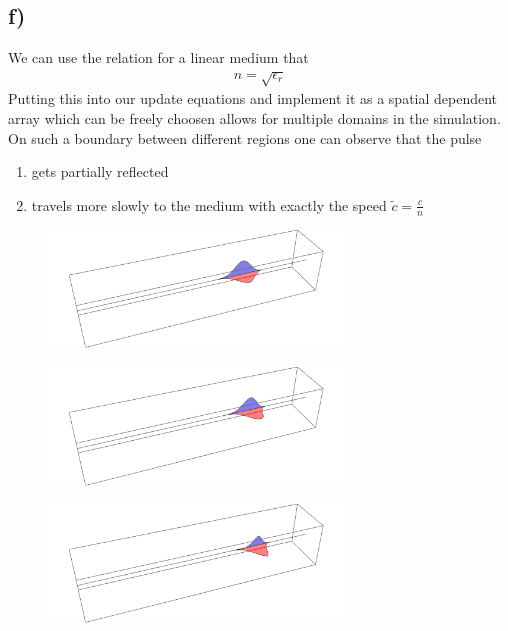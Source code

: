 \documentclass[12pt,a4paper]{article}
\begin{document}
	\subsection*{f)}
	We can use the relation for a linear medium that
	\begin{align}
		n=\sqrt{\epsilon_r}
	\end{align}
	Putting this into our update equations and implement it as a spatial dependent array which can
	be freely choosen allows for multiple domains in the simulation.\\
	On such a boundary between different regions one can observe that the pulse
	\begin{enumerate}
		\item gets partially reflected
		\item travels more slowly to the medium with exactly the speed \(\tilde{c}=\frac{c}{n}\)
	\end{enumerate}
	\begin{figure}[H]
		\centering
		\includegraphics[width=0.7\textwidth]{A2/data/A2f_Transition_1.png}
	\end{figure}
	\begin{figure}[H]
		\centering
		\includegraphics[width=0.7\textwidth]{A2/data/A2f_Transition_2.png}
	\end{figure}
	\begin{figure}[H]
		\centering
		\includegraphics[width=0.7\textwidth]{A2/data/A2f_Transition_3.png}
	\end{figure}
\end{document}
